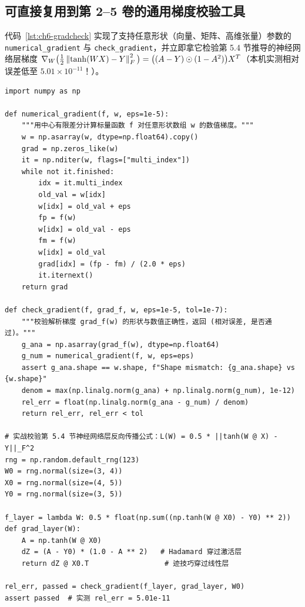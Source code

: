 \subsection{可直接复用到第 2--5 卷的通用梯度校验工具}

代码~\ref{lst:ch6-gradcheck} 实现了支持任意形状（向量、矩阵、高维张量）参数的 \texttt{numerical\_gradient} 与 \texttt{check\_gradient}，并立即拿它检验第 5.4 节推导的神经网络层梯度 $\nabla_W\big(\frac{1}{2}\left\|\tanh(WX)-Y\right\|_F^2\big) = \big((A-Y)\odot(1-A^2)\big)X^T$（本机实测相对误差低至 $5.01\times 10^{-11}$！）。

\begin{lstlisting}[caption={通用中心差分梯度校验工具（支持任意维度 NumPy 张量）},label={lst:ch6-gradcheck}]
import numpy as np

def numerical_gradient(f, w, eps=1e-5):
    """用中心有限差分计算标量函数 f 对任意形状数组 w 的数值梯度。"""
    w = np.asarray(w, dtype=np.float64).copy()
    grad = np.zeros_like(w)
    it = np.nditer(w, flags=["multi_index"])
    while not it.finished:
        idx = it.multi_index
        old_val = w[idx]
        w[idx] = old_val + eps
        fp = f(w)
        w[idx] = old_val - eps
        fm = f(w)
        w[idx] = old_val
        grad[idx] = (fp - fm) / (2.0 * eps)
        it.iternext()
    return grad

def check_gradient(f, grad_f, w, eps=1e-5, tol=1e-7):
    """校验解析梯度 grad_f(w) 的形状与数值正确性，返回 (相对误差, 是否通过)。"""
    g_ana = np.asarray(grad_f(w), dtype=np.float64)
    g_num = numerical_gradient(f, w, eps=eps)
    assert g_ana.shape == w.shape, f"Shape mismatch: {g_ana.shape} vs {w.shape}"
    denom = max(np.linalg.norm(g_ana) + np.linalg.norm(g_num), 1e-12)
    rel_err = float(np.linalg.norm(g_ana - g_num) / denom)
    return rel_err, rel_err < tol

# 实战校验第 5.4 节神经网络层反向传播公式：L(W) = 0.5 * ||tanh(W @ X) - Y||_F^2
rng = np.random.default_rng(123)
W0 = rng.normal(size=(3, 4))
X0 = rng.normal(size=(4, 5))
Y0 = rng.normal(size=(3, 5))

f_layer = lambda W: 0.5 * float(np.sum((np.tanh(W @ X0) - Y0) ** 2))
def grad_layer(W):
    A = np.tanh(W @ X0)
    dZ = (A - Y0) * (1.0 - A ** 2)   # Hadamard 穿过激活层
    return dZ @ X0.T                  # 迹技巧穿过线性层

rel_err, passed = check_gradient(f_layer, grad_layer, W0)
assert passed  # 实测 rel_err = 5.01e-11
\end{lstlisting}

